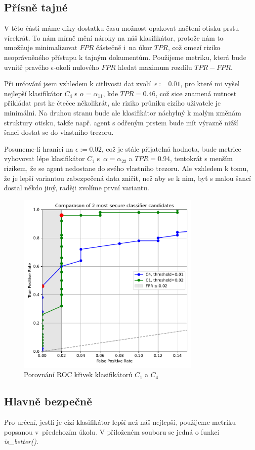 \documentclass[a4paper,12pt]{article}
\begin{document}
\subsection{Přísně tajné}
V této části máme díky dostatku času možnost opakovat načtení otisku prstu vícekrát. To nám mírně mění nároky na náš klasifikátor, protože nám to umožňuje minimalizovat $FPR$ částečně i~na úkor $TPR$, což omezí riziko neoprávněného přístupu k tajným dokumentům. Použijeme metriku, která bude uvnitř pravého $\epsilon$-okolí nulového $FPR$ hledat maximum rozdílu $TPR-FPR$. 

Při určování jsem vzhledem k citlivosti dat zvolil $\epsilon:= 0.01$, pro které mi vyšel nejlepší klasifikátor $C_4$ s $\alpha=\alpha_{11}$, kde $TPR=0.46$, což sice znamená nutnost přikládat prst ke čtečce několikrát, ale riziko průniku cizího uživatele je minimální. Na druhou stranu bude ale klasifikátor náchylný k malým změnám struktury otisku, takže např. agent s odřeným prstem bude mít výrazně nižší šanci dostat se do vlastního trezoru. 

Posuneme-li hranici na $\epsilon := 0.02$, což je stále přijatelná hodnota, bude metrice vyhovovat lépe klasifikátor $C_1$ s~$\alpha = \alpha_{22}$ a $TPR=0.94$, tentokrát s menším rizikem, že se agent nedostane do svého vlastního trezoru. Ale vzhledem k tomu, že je lepší variantou zabezpečená data zničit, než aby se k nim, byť s malou šancí dostal někdo jiný, raději zvolíme první variantu.

\begin{figure}[H]
    \centering
    \includegraphics[width=0.8\textwidth]{roc_comparison.pdf}
    \caption{Porovnání ROC křivek klasifikátorů $C_1$ a $C_4$}
    \label{fig:roc_comp}
\end{figure}

\subsection{Hlavně bezpečně}
Pro určení, jestli je cizí klasifikátor lepší než náš nejlepší, použijeme metriku popsanou v~předchozím úkolu. V přiloženém souboru se jedná o funkci \textit{is\_better()}.
\end{document}
